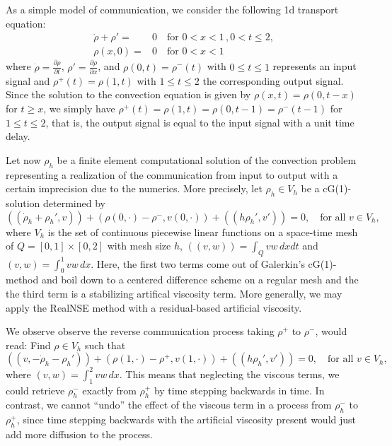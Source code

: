  
As a simple model of communication, we consider the following
1d transport equation:
\begin{equation}\label{convection}
\begin{split}
\dot\rho + \rho '=&0\quad \mbox{for } 0<x<1\, ,0<t\le 2,\\
\rho (x,0)=&0 \quad \mbox{for } 0<x<1\,
\end{split} 
\end{equation}
where $\dot\rho =\frac{\partial \rho}{\partial t}$, 
$\rho '=\frac{\partial \rho}{\partial x}$, and
$\rho (0,t)=\rho^-(t)$ with $0\le t\le 1$  
represents an input signal and $\rho^+(t)=\rho (1,t)$
with $1\le t\le 2$ the corresponding output signal. Since the solution to the 
convection equation is given by $\rho (x,t)=\rho (0,t-x)$ for
$t\ge x$, we simply have $\rho^+(t)=\rho (1,t)=\rho (0,t-1)=\rho^-(t-1)$ for $1\le t\le 2$, that is, 
the output signal is equal to the input signal with a unit time delay.

Let now $\rho_h$ be a finite element computational solution of the convection
problem representing a realization of the communication from input to
output with a certain imprecision due to the numerics. 
More precisely, let $\rho_h\in V_h$ be
a cG(1)-solution determined by
\begin{equation}\label{g2}
((\dot\rho_h+\rho_h',v))+(\rho (0,\cdot )-\rho^-,v(0,\cdot ))+((h\rho_h',v'))=0,
\quad\mbox{for all } v\in V_h,
\end{equation}
where $V_h$ is the set of continuous piecewise linear functions
on a space-time mesh of $Q=[0,1]\times [0,2]$ with mesh size $h$, $((v,w))=\int_Qvw\, dxdt$
and $(v,w)=\int_0^1vw\, dx$.  Here, the first two terms come out of
Galerkin's cG(1)-method and boil down to a centered difference
scheme on a regular mesh and the the third term is a stabilizing
artifical viscosity
term. More generally, we may apply the RealNSE method
with a residual-based artificial viscosity. 

We observe observe the reverse  
communication process taking $\rho^+$ to $\rho^-$, would
read: Find $\rho\in V_h$ such that
\[
((v,-\dot\rho_h-\rho_h'))+(\rho (1,\cdot )-\rho^+,v(1,\cdot ))
+((h\rho_h',v'))=0,
\quad\mbox{for all } v\in V_h,
\]
where $(v,w)=\int_1^2vw\, dx$. This means that neglecting the 
viscous terms, we could retrieve $\rho_h^-$ exactly from $\rho^+_h$ by
time stepping backwards in time. In contrast, we cannot ``undo''  the
effect of the viscous term in a process from $\rho_h^-$ to $\rho_h^+$,
since time stepping backwards with the artificial viscosity
present would just add more diffusion to the
process.

